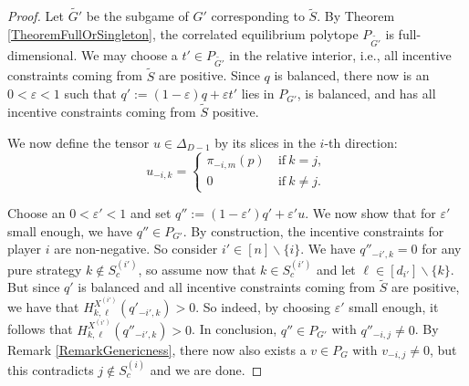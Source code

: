 \documentclass[11pt]{amsart}
\theoremstyle{definition}
\numberwithin{subcase}{case}
\renewcommand{\tilde}[1]{\widetilde{#1}}
\begin{document}
\begin{proof}
Let $\tilde{G'}$ be the subgame of $G'$ corresponding to $\tilde{S}$.
By Theorem \ref{TheoremFullOrSingleton}, the correlated equilibrium
polytope $P_{\tilde{G'}}$ is full-dimensional.  We may choose a $t' \in
P_{\tilde{G'}}$ in the relative interior, i.e., all incentive constraints
coming from $\tilde{S}$ are positive. Since $q$ is balanced, there now is
an $0<\varepsilon <1$ such that $q':=(1-\varepsilon)q+ \varepsilon t'$
lies in $P_{G'}$,  is balanced, and has 
all incentive constraints coming from $\tilde{S}$ positive.

We now define the tensor $u \in \Delta_{D-1}$ by its slices in the
$i$-th direction: 
\[u_{-i,k} =  \begin{cases}
   \pi_{-i,m} (p) & \ \text{if} \ k = j, \\
   0 & \ \text{if} \ k \neq j.
\end{cases}   \] 

Choose an $0<\varepsilon' <1$ and set $q'':=(1-\varepsilon')q'+
\varepsilon' u$. We now show that for $\varepsilon'$ small enough, we
have $q'' \in P_{G'}$. By construction, the incentive
constraints for player $i$ are non-negative. So consider $i' \in [n]
\backslash \{i \}$. We have $q''_{-i',k} =0$ for any pure strategy $k \not\in S^{(i')}_c$, so assume now that $k \in S^{(i')}_c$ and let $\ell \in [d_{i'}] \backslash \{k\}$. But since $q'$ is balanced and all incentive constraints coming from $\tilde{S}$ are positive, we have that $H^{X^{(i')}}_{k,\ell}(q'_{-i',k})>0$. So indeed, by choosing $\varepsilon'$ small enough, it follows that  $H^{X^{(i')}}_{k,\ell}(q''_{-i',k})>0$. In conclusion, $q'' \in P_{G'}$ with $q''_{-i,j} \neq 0$. By Remark \ref{RemarkGenericness}, there now also exists a $v \in P_G$ with $v_{-i,j} \neq 0$, but this contradicts $j \not\in S^{(i)}_c$ and we are done.
\end{proof}
\end{document}
